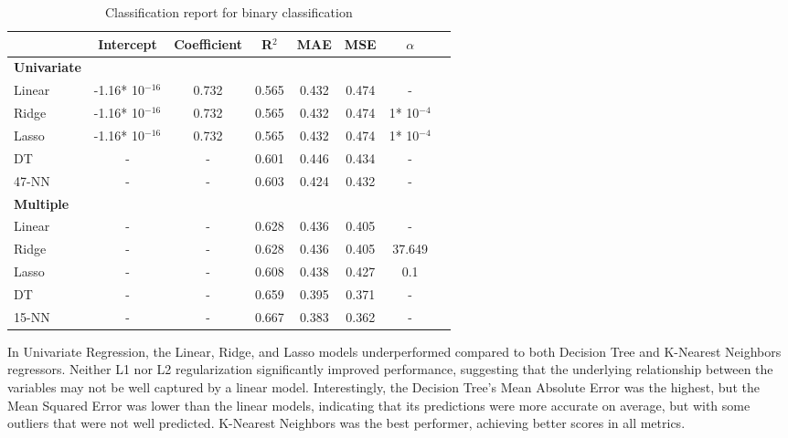 \begin{table}[H]
    \centering
    \begin{tabular}{lccccccc}
        \toprule
         & \textbf{Intercept} & \textbf{Coefficient} & \textbf{R$^2$} & \textbf{MAE} & \textbf{MSE} & $\alpha$ \\
        \midrule
        \textbf{Univariate} \\
        \midrule
        Linear & -1.16* 10$^{-16}$ & 0.732 & 0.565 & 0.432 & 0.474 & - \\ %
        Ridge & -1.16* 10$^{-16}$ & 0.732 & 0.565 & 0.432 & 0.474 & 1* 10$^{-4}$ \\ %
        Lasso & -1.16* 10$^{-16}$ & 0.732 & 0.565 & 0.432 & 0.474 & 1* 10$^{-4}$ \\ %
        DT & - & - & 0.601 & 0.446 & 0.434 & - \\
        47-NN & - & - & 0.603 & 0.424 & 0.432 & - \\
        \midrule
        \textbf{Multiple}\\
        \midrule
        Linear & - & - & 0.628 & 0.436 & 0.405 & - \\
        Ridge & - & - & 0.628 & 0.436 & 0.405 & 37.649 \\ %
        Lasso & - & - & 0.608 & 0.438 & 0.427 & 0.1 \\ %
        DT & - & - & 0.659 & 0.395 & 0.371 & - \\
        15-NN & - & - & 0.667 & 0.383 & 0.362 & - \\
        \bottomrule
    \end{tabular}
    \caption{Classification report for binary classification}
    \label{tab:uni_multi_regression_report}
\end{table}
In Univariate Regression, the Linear, Ridge, and Lasso models underperformed compared to both Decision
Tree and K-Nearest Neighbors regressors. Neither L1 nor L2 regularization significantly improved
performance, suggesting that the underlying relationship between the variables may not be well
captured by a linear model. 
Interestingly, the Decision Tree's Mean Absolute Error was the highest, but the Mean Squared Error was
lower than the linear models, indicating that its predictions were more accurate
on average, but with some outliers that were not well predicted.
K-Nearest Neighbors was the best performer, achieving better scores in all metrics.

